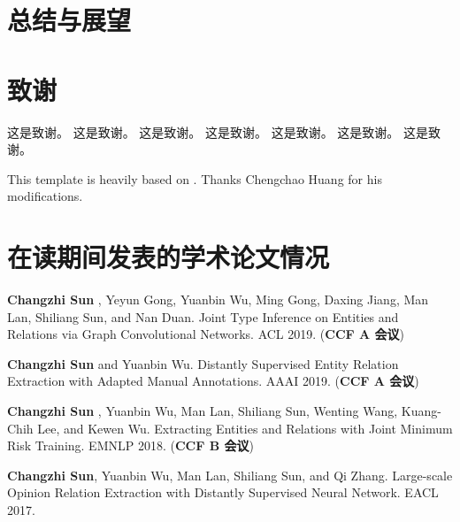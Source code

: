 \documentclass[UTF8,openright]{ctexbook}
\begin{document}
\chapter{总结与展望}
  


\clearpage{\pagestyle{empty}\cleardoublepage}
\backmatter

\fancyfoot[CO,CE]{{\thepage}}
\backmatter%
\chapter*{ }
\setlength{\bibsep}{0.5ex} %
\linespread{1.2}\selectfont
{}



\clearpage{\pagestyle{empty}\cleardoublepage}
\chapter*{致谢}

这是致谢。
这是致谢。
这是致谢。
这是致谢。
这是致谢。
这是致谢。
这是致谢。

This template is heavily based on \citep{ecnu-thesis}. 
Thanks Chengchao Huang for his modifications.

\clearpage{\pagestyle{empty}\cleardoublepage}
\chapter*{在读期间发表的学术论文情况}
\begin{enumerate}[ {[}1{]} ]
    \item \textbf{Changzhi Sun} , Yeyun Gong, Yuanbin Wu, Ming Gong, Daxing Jiang, Man Lan, Shiliang Sun, and Nan Duan.
    Joint Type Inference on Entities and Relations via Graph Convolutional Networks.
    ACL 2019. (\textbf{CCF A 会议})
\item \textbf{Changzhi Sun} and Yuanbin Wu.
    Distantly Supervised Entity Relation Extraction with Adapted Manual Annotations.
    AAAI 2019. (\textbf{CCF A 会议})
\item  \textbf{Changzhi Sun} , Yuanbin Wu, Man Lan, Shiliang Sun, Wenting Wang, Kuang-Chih Lee, and Kewen Wu.
    Extracting Entities and Relations with Joint Minimum Risk Training.
    EMNLP 2018. (\textbf{CCF B 会议})
\item \textbf{Changzhi Sun}, Yuanbin Wu, Man Lan, Shiliang Sun, and Qi Zhang.
    Large-scale Opinion Relation Extraction with Distantly Supervised Neural Network.
    EACL 2017.
\end{enumerate}
\end{document}
